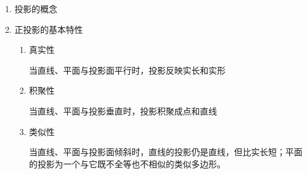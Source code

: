 \begin{enumerate}
\item 投影的概念
\item 正投影的基本特性
\begin{enumerate}
\item 真实性

当直线、平面与投影面平行时，投影反映实长和实形
\item 积聚性

当直线、平面与投影垂直时，投影积聚成点和直线
\item 类似性

当直线、平面与投影面倾斜时，直线的投影仍是直线，但比实长短；平面的投影为一个与它既不全等也不相似的类似多边形。
\end{enumerate}
\end{enumerate}

\endinput